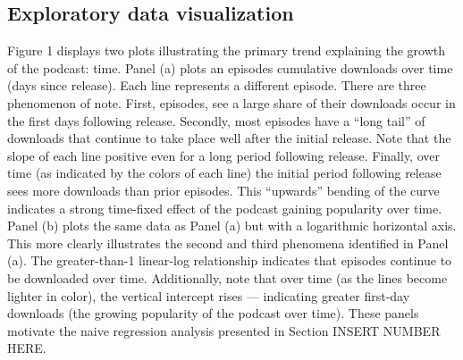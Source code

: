 \documentclass[11pt, letterpaper, twoside]{article}
\begin{document}


\subsection{Exploratory data visualization}
Figure 1 displays two plots illustrating the primary trend explaining the growth of the podcast: time. Panel (a) plots an episodes cumulative downloads over time (days since release). Each line represents a different episode. There are three phenomenon of note. First, episodes, see a large share of their downloads occur in the first days following release. Secondly, most episodes have a ``long tail'' of downloads that continue to take place well after the initial release. Note that the slope of each line positive even for a long period following release. Finally, over time (as indicated by the colors of each line) the initial period following release sees more downloads than prior episodes. This ``upwards'' bending of the curve indicates a strong time-fixed effect of the podcast gaining popularity over time. Panel (b) plots the same data as Panel (a) but with a logarithmic horizontal axis. This more clearly illustrates the second and third phenomena identified in Panel (a). The greater-than-1 linear-log relationship indicates that episodes continue to be downloaded over time. Additionally, note that over time (as the lines become lighter in color), the vertical intercept rises --- indicating greater first-day downloads (the growing popularity of the podcast over time). These panels motivate the naive regression analysis presented in Section INSERT NUMBER HERE.\\
\end{document}
